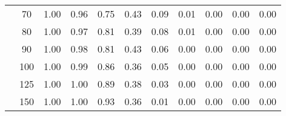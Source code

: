 \begin{table}[t]
\begin{center}
\begin{subtable}[c]{\textwidth}
\begin{center}
\begin{tabular}{rcccccccccc}
                                        & \multicolumn{1}{c|}{70}  & \num{1.00}  & \num{0.96}  & \num{0.75}  & \num{0.43}  & \num{0.09}  & \num{0.01}  & \num{0.00}  & \num{0.00}  & \num{0.00}  \\
                                        & \multicolumn{1}{c|}{80}  & \num{1.00}  & \num{0.97}  & \num{0.81}  & \num{0.39}  & \num{0.08}  & \num{0.01}  & \num{0.00}  & \num{0.00}  & \num{0.00}  \\
                                        & \multicolumn{1}{c|}{90}  & \num{1.00}  & \num{0.98}  & \num{0.81}  & \num{0.43}  & \num{0.06}  & \num{0.00}  & \num{0.00}  & \num{0.00}  & \num{0.00}  \\
                                        & \multicolumn{1}{c|}{100}  & \num{1.00}  & \num{0.99}  & \num{0.86}  & \num{0.36}  & \num{0.05}  & \num{0.00}  & \num{0.00}  & \num{0.00}  & \num{0.00}  \\
                                        & \multicolumn{1}{c|}{125}  & \num{1.00}  & \num{1.00}  & \num{0.89}  & \num{0.38}  & \num{0.03}  & \num{0.00}  & \num{0.00}  & \num{0.00}  & \num{0.00}  \\
                                        & \multicolumn{1}{c|}{150}  & \num{1.00}  & \num{1.00}  & \num{0.93}  & \num{0.36}  & \num{0.01}  & \num{0.00}  & \num{0.00}  & \num{0.00}  & \num{0.00}  \\
                                    \end{tabular}
            \end{center}
        \end{subtable}

        \vspace{5mm}


\end{center}
\end{table}
